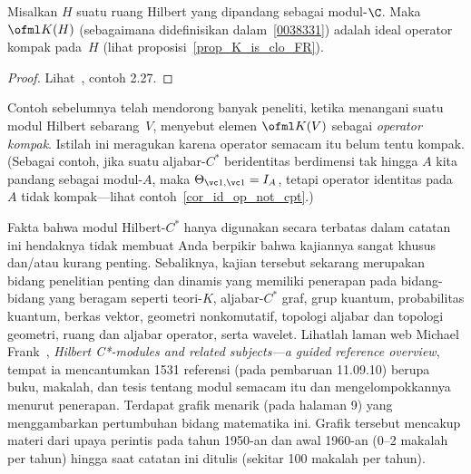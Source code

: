 \begin{exam}\label{0038341} Misalkan $H$ suatu ruang Hilbert yang dipandang sebagai modul-$\C$. Maka
$\ofml K(H)$ (sebagaimana didefinisikan dalam~\ref{0038331}) adalah ideal operator kompak pada~$H$ (lihat
proposisi~\ref{prop_K_is_clo_FR}).
\end{exam}

\begin{proof} Lihat~\cite{RaeburnW:1998}, contoh 2.27. \ns \end{proof}

Contoh sebelumnya telah mendorong banyak peneliti, ketika menangani suatu modul Hilbert sebarang~$V$,
menyebut elemen $\ofml K(V)$ sebagai \emph{operator kompak}. Istilah ini
meragukan karena operator semacam itu belum tentu kompak. (Sebagai contoh, jika
suatu aljabar-$C^*$ beridentitas berdimensi tak hingga $A$ kita pandang sebagai modul-$A$, maka
$\Theta_{\vc 1,\vc 1} = I_A$, tetapi operator identitas pada $A$ tidak kompak---lihat
contoh~\ref{cor_id_op_not_cpt}.)

Fakta bahwa modul Hilbert-$C^*$ hanya digunakan secara terbatas dalam catatan ini hendaknya
tidak membuat Anda berpikir bahwa kajiannya sangat khusus dan/atau kurang penting.
Sebaliknya,
kajian tersebut sekarang merupakan bidang penelitian penting dan dinamis yang memiliki penerapan
pada bidang-bidang yang beragam seperti teori-$K$, aljabar-$C^*$ graf, grup kuantum, probabilitas
kuantum, berkas vektor, geometri nonkomutatif, topologi aljabar dan topologi geometri,
ruang dan aljabar operator, serta wavelet. Lihatlah
laman web Michael Frank~\cite{Frank:2010}, \emph{Hilbert C*-modules and related subjects---a guided
reference overview}, tempat ia mencantumkan 1531 referensi (pada pembaruan 11.09.10) berupa buku,
makalah, dan tesis tentang modul semacam itu dan mengelompokkannya menurut penerapan. Terdapat
grafik menarik (pada halaman 9) yang menggambarkan pertumbuhan bidang
matematika ini. Grafik tersebut mencakup materi dari upaya perintis pada tahun 1950-an dan awal 1960-an
(0--2 makalah per tahun) hingga saat catatan ini ditulis (sekitar 100 makalah per tahun).





























